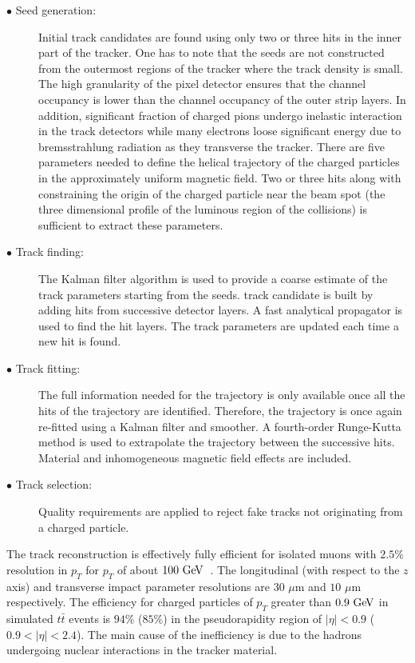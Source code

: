 \begin{description}
\item[$\bullet$ Seed generation:]  Initial track candidates are found using only two or three hits in the inner part of the tracker. One has to note that the seeds are not constructed from the outermost regions of the tracker where the track density is small. The high granularity of the pixel detector ensures that the channel occupancy is lower than the channel occupancy of the outer strip layers. In addition, significant fraction of charged pions undergo inelastic interaction in the track detectors while many electrons loose significant energy due to bremsstrahlung radiation as they transverse the tracker. There are five parameters needed to define the helical trajectory of the charged particles in the approximately uniform magnetic field. Two or three hits along with constraining the origin of the charged particle near the beam spot (the three dimensional profile of the luminous region of the collisions) is sufficient to extract these parameters.
\item[$\bullet$ Track finding:]  The Kalman filter algorithm is used to provide a coarse estimate of the track parameters starting from the seeds.  track candidate is built by adding hits from successive detector layers. A fast analytical propagator is used to find the hit layers. The track parameters are updated each time a new hit is found.
\item[$\bullet$ Track fitting:] The full information needed for the trajectory is only available once all the hits of the trajectory are identified. Therefore, the trajectory is once again re-fitted using a Kalman filter and smoother. A fourth-order Runge-Kutta method is used to extrapolate the trajectory between the successive hits. Material and inhomogeneous magnetic field effects are included.
\item[$\bullet$ Track selection:] Quality requirements are applied to reject fake tracks not originating from a charged particle. 
\end{description}

The track reconstruction is effectively fully efficient for isolated muons with $2.5\%$ resolution in $p_{T}$ for $p_{T}$ of about $100~\mathrm{Ge\kern -0.1em V}$~\cite{Chatrchyan:2014fea}. The longitudinal (with respect to the $z$ axis) and transverse impact parameter resolutions are $30$ $\mu$m and $10$ $\mu$m respectively. The efficiency for charged particles of $p_{T}$ greater than $0.9~\mathrm{Ge\kern -0.1em V}$ in simulated $t\bar{t}$ events is $94\%$ ($85\%$) in the pseudorapidity region of $|\eta|<0.9$ ($0.9<|\eta|<2.4$). The main cause of the inefficiency is due to the hadrons undergoing nuclear interactions in the tracker material.   

